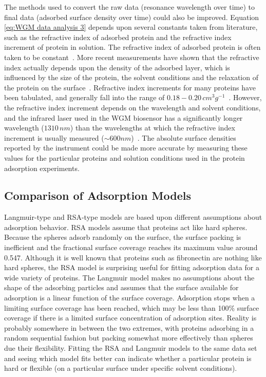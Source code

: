 The methods used to convert the raw data (resonance wavelength over
time) to final data (adsorbed surface density over time) could also
be improved. Equation \ref{eq:WGM data analysis 3} depends upon several
constants taken from literature, such as the refractive index of adsorbed
protein and the refractive index increment of protein in solution.
The refractive index of adsorbed protein is often taken to be constant~\cite{Akimoto1999}.
More recent measurements have shown that the refractive index actually
depends upon the density of the adsorbed layer, which is influenced
by the size of the protein, the solvent conditions and the relaxation
of the protein on the surface~\cite{Voros2004}. Refractive index
increments for many proteins have been tabulated, and generally fall
into the range of $0.18-0.20\, cm^{3}g^{-1}$~\cite{Fasman1989}.
However, the refractive index increment depends on the wavelength
and solvent conditions, and the infrared laser used in the WGM biosensor
has a significantly longer wavelength ($1310\, nm$) than the wavelengths
at which the refractive index increment is usually measured ($\sim600nm$)~\cite{Rocco1983}.
The absolute surface densities reported by the instrument could be
made more accurate by measuring these values for the particular proteins
and solution conditions used in the protein adsorption experiments.


\subsection{Comparison of Adsorption Models}

Langmuir-type and RSA-type models are based upon different assumptions
about adsorption behavior. RSA models assume that proteins act like
hard spheres. Because the spheres adsorb randomly on the surface,
the surface packing is inefficient and the fractional surface coverage
reaches its maximum value around 0.547. Although it is well known
that proteins such as fibronectin are nothing like hard spheres, the
RSA model is surprising useful for fitting adsorption data for a wide
variety of proteins. The Langmuir model makes no assumptions about
the shape of the adsorbing particles and assumes that the surface
available for adsorption is a linear function of the surface coverage.
Adsorption stops when a limiting surface coverage has been reached,
which may be less than 100\% surface coverage if there is a limited
surface concentration of adsorption sites. Reality is probably somewhere
in between the two extremes, with proteins adsorbing in a random sequential
fashion but packing somewhat more effectively than spheres due their
flexibility. Fitting the RSA and Langmuir models to the same data
set and seeing which model fits better can indicate whether a particular
protein is hard or flexible (on a particular surface under specific
solvent conditions).

